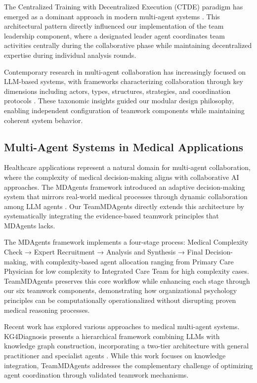 \documentclass[letterpaper]{article} %
\begin{document}
The Centralized Training with Decentralized Execution (CTDE) paradigm has emerged as a dominant approach in modern multi-agent systems \cite{foerster2018counterfactual}. This architectural pattern directly influenced our implementation of the team leadership component, where a designated leader agent coordinates team activities centrally during the collaborative phase while maintaining decentralized expertise during individual analysis rounds.

Contemporary research in multi-agent collaboration has increasingly focused on LLM-based systems, with frameworks characterizing collaboration through key dimensions including actors, types, structures, strategies, and coordination protocols \cite{chen2025multiagent}. These taxonomic insights guided our modular design philosophy, enabling independent configuration of teamwork components while maintaining coherent system behavior.

\subsection{Multi-Agent Systems in Medical Applications}

Healthcare applications represent a natural domain for multi-agent collaboration, where the complexity of medical decision-making aligns with collaborative AI approaches. The MDAgents framework introduced an adaptive decision-making system that mirrors real-world medical processes through dynamic collaboration among LLM agents \cite{kim2024mdagents}. Our TeamMDAgents directly extends this architecture by systematically integrating the evidence-based teamwork principles that MDAgents lacks.

The MDAgents framework implements a four-stage process: Medical Complexity Check → Expert Recruitment → Analysis and Synthesis → Final Decision-making, with complexity-based agent allocation ranging from Primary Care Physician for low complexity to Integrated Care Team for high complexity cases. TeamMDAgents preserves this core workflow while enhancing each stage through our six teamwork components, demonstrating how organizational psychology principles can be computationally operationalized without disrupting proven medical reasoning processes.

Recent work has explored various approaches to medical multi-agent systems. KG4Diagnosis presents a hierarchical framework combining LLMs with knowledge graph construction, incorporating a two-tier architecture with general practitioner and specialist agents \cite{zhang2024kg4diagnosis}. While this work focuses on knowledge integration, TeamMDAgents addresses the complementary challenge of optimizing agent coordination through validated teamwork mechanisms.
\end{document}
